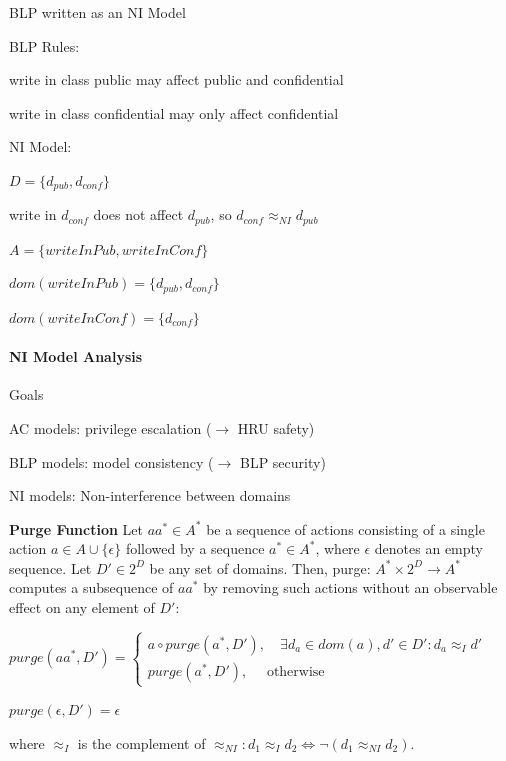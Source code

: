 \documentclass[a4paper]{article}
\renewcommand{\note}[2]{\begin{noteBox} \textbf{#1} #2 \end{noteBox}}
\begin{document}
\begin{multicols}{3}
    BLP written as an NI Model
    \begin{itemize*}
        \item BLP Rules:
        \begin{itemize*}
            \item write in class public may affect public and confidential
            \item write in class confidential may only affect confidential
        \end{itemize*}
        \item NI Model:
        \begin{itemize*}
            \item $D=\{d_{pub},d_{conf}\}$
            \item write in $d_{conf}$ does not affect $d_{pub}$, so $d_{conf} \approx_{NI} d_{pub}$
            \item $A=\{writeInPub, writeInConf\}$
            \item $dom(writeInPub)=\{d_{pub},d_{conf}\}$
            \item $dom(writeInConf)=\{d_{conf}\}$
        \end{itemize*}
    \end{itemize*}

    \paragraph{NI Model Analysis}
    Goals
    \begin{itemize*}
        \item AC models: privilege escalation ($\rightarrow$ HRU safety)
        \item BLP models: model consistency ($\rightarrow$ BLP security)
        \item NI models: Non-interference between domains
    \end{itemize*}

    \note{Purge Function}{Let $aa^*\in A^*$ be a sequence of actions consisting of a single action $a\in A\cup\{\epsilon\}$ followed by a sequence $a^*\in A^*$, where $\epsilon$ denotes an empty sequence. Let $D'\in 2^D$ be any set of domains. Then, purge: $A^*\times 2^D \rightarrow A^*$ computes a subsequence of $aa^*$ by removing such actions without an observable effect on any element of $D':$
        \begin{itemize*}
            \item $purge(aa^*,D')=\begin{cases} a\circ purge(a^*,D'), \quad\exists d_a\in dom(a),d'\in D':d_a\approx_I d' \\ purge(a^*,D'), \quad\text{ otherwise }\end{cases}$
            \item $purge(\epsilon,D')=\epsilon$
        \end{itemize*}
        where $\approx_I$ is the complement of $\approx_{NI}:d_1 \approx_I d_2\Leftrightarrow \lnot(d_1 \approx_{NI} d_2)$.
    }


\end{multicols}
\end{document}
